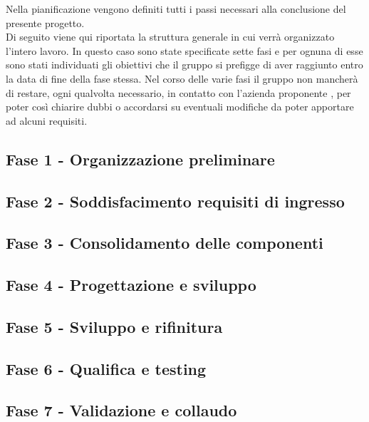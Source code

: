Nella pianificazione vengono definiti tutti i passi necessari alla conclusione del presente progetto. \\
Di seguito viene qui riportata la struttura generale in cui verrà organizzato l'intero lavoro. In questo caso sono state specificate sette fasi e per ognuna di esse sono stati individuati gli obiettivi che il gruppo \Gruppo{} si prefigge di aver raggiunto entro la data di fine della fase stessa. Nel corso delle varie fasi il gruppo non mancherà di restare, ogni qualvolta necessario, in contatto con l'azienda proponente \proponente{}, per poter così chiarire dubbi o accordarsi su eventuali modifiche da poter apportare ad alcuni requisiti.

\subsection{Fase 1 - Organizzazione preliminare}\label{sec:Fase1}


\subsection{Fase 2 - Soddisfacimento requisiti di ingresso}\label{sec:Fase2}

    
\subsection{Fase 3 - Consolidamento delle componenti}\label{sec:Fase3}

    
\subsection{Fase 4 - Progettazione e sviluppo}\label{sec:Fase4}

    
\subsection{Fase 5 - Sviluppo e rifinitura }\label{sec:Fase5}

    
\subsection{Fase 6 - Qualifica e testing}\label{sec:Fase6}

    
\subsection{Fase 7 - Validazione e collaudo}\label{sec:Fase7}
